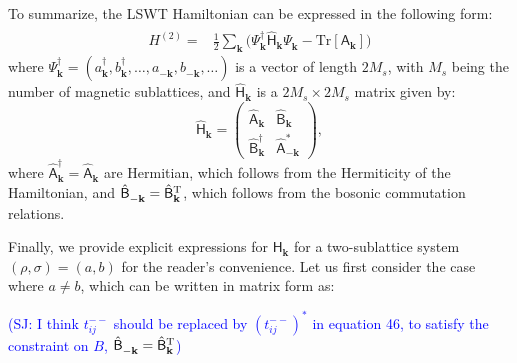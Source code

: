 \documentclass[aps, prx, nofootinbib, superscriptaddress]{revtex4-2}
\newcommand{\Tr}{\mathrm{Tr}}
\begin{document}
To summarize, the LSWT Hamiltonian can be expressed in the following form:
\begin{align}
    H^{(2)} 
    = & \frac{1}{2}\sum_{\mathbf{k}} \Big(     
        \Psi_{\mathbf{k}}^\dagger \hat{\mathsf{H}}_{\mathbf{k}}^{\phantom{\dagger}} \Psi_{\mathbf{k}}^{\phantom{\dagger}} 
    - \Tr [\mathsf{A}_{\mathbf{k}}] \Big)
\end{align}
where $\Psi^\dagger_{\mathbf{k}}=\left( a^\dagger_{\mathbf{k}}, b^\dagger_{\mathbf{k}},\dots, a^{\phantom \dagger}_{-\mathbf{k}},b^{\phantom \dagger}_{-\mathbf{k}},\dots\right)$ is a vector of length $2 M_s$, with $M_s$ being the number of magnetic sublattices, and $\hat{\mathsf{H}}_{\mathbf{k}}$ is a $2M_s\times 2M_s$ matrix given by:
\begin{equation}
    \hat{\mathsf{H}}_{\mathbf{k}} = 
    \begin{pmatrix}
        \hat{\mathsf{A}}^{\phantom \dagger}_{\mathbf{k}} &  \hat{\mathsf{B}}^{\phantom \dagger}_{\mathbf{k}}\\[0.5ex] 
        \hat{\mathsf{B}}^\dagger_{\mathbf{k}}  & \hat{\mathsf{A}}^*_{-\mathbf{k}}
    \end{pmatrix},
\end{equation}
where $\hat{\mathsf{A}}^{\dagger}_{\mathbf{k}} = \hat{\mathsf{A}}^{\phantom \dagger}_{\mathbf{k}}$ are Hermitian, which follows from the Hermiticity of the Hamiltonian, and $\hat{\mathsf{B}}^{\phantom *}_{-\mathbf{k}} = \hat{\mathsf{B}}^{\rm T}_{\mathbf{k}}$, which follows from the bosonic commutation relations. 

Finally, we provide explicit expressions for $\mathsf{H}_{\mathbf{k}}$ for a two-sublattice system $(\rho, \sigma) = (a, b)$ for the reader's convenience.
Let us first consider the case where $a \neq b$, which can be written in matrix form as: 

\textcolor{blue}{(SJ: I think $t^{--}_{ij}$ should be replaced by $(t^{--}_{ij})^{*}$ in equation 46, to satisfy the constraint on $B$, $\hat{\mathsf{B}}^{\phantom *}_{-\mathbf{k}} = \hat{\mathsf{B}}^{\rm T}_{\mathbf{k}} $) }
\end{document}

